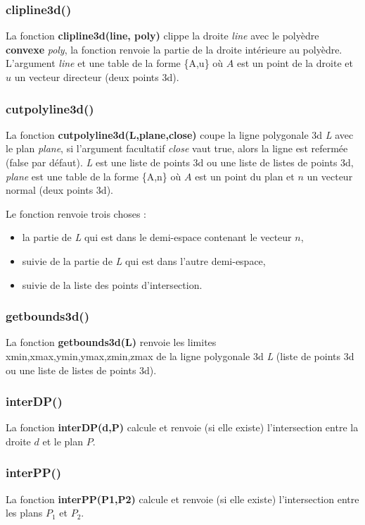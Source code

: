 \subsubsection{clipline3d()}
La fonction \textbf{clipline3d(line, poly)} clippe la droite \emph{line} avec le polyèdre \textbf{convexe} \emph{poly}, la fonction renvoie la partie de la droite intérieure au polyèdre. L'argument \emph{line} et une table de la forme \{A,u\} où $A$ est un point de la droite et $u$ un vecteur directeur (deux points 3d).

\subsubsection{cutpolyline3d()}
La fonction \textbf{cutpolyline3d(L,plane,close)} coupe la ligne polygonale 3d \emph{L} avec le plan \emph{plane}, si l'argument facultatif \emph{close} vaut true, alors la ligne est refermée (false par défaut).
\emph{L} est une liste de points 3d ou une liste de listes de points 3d, \emph{plane} est une table de la forme \{A,n\} où $A$ est un point du plan et $n$ un vecteur normal (deux points 3d).

Le fonction renvoie trois choses :
\begin{itemize}
    \item la partie de \emph{L} qui est dans le demi-espace contenant le vecteur $n$,
    \item suivie de la partie de \emph{L} qui est dans l'autre demi-espace,
    \item suivie de la liste des points d'intersection.
\end{itemize}

\subsubsection{getbounds3d()}
La fonction \textbf{getbounds3d(L)} renvoie les limites xmin,xmax,ymin,ymax,zmin,zmax de la ligne polygonale 3d \emph{L} (liste de points 3d ou une liste de listes de points 3d).

\subsubsection{interDP()}
La fonction \textbf{interDP(d,P)} calcule et renvoie (si elle existe) l'intersection entre la droite $d$ et le plan $P$.

\subsubsection{interPP()}
La fonction \textbf{interPP(P1,P2)} calcule et renvoie (si elle existe) l'intersection entre les plans $P_1$ et $P_2$.

